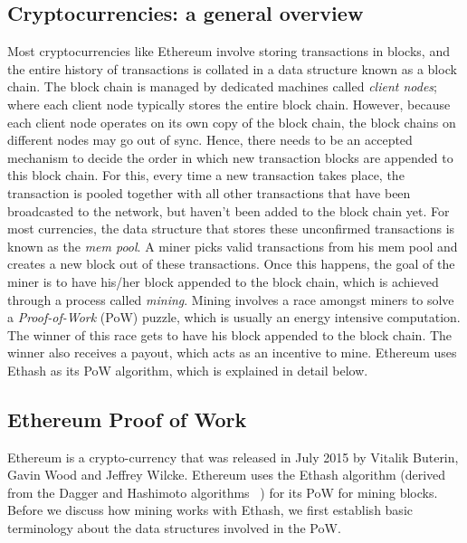 \documentclass[runningheads]{llncs}
\begin{document}
\subsection{Cryptocurrencies: a general overview}
Most cryptocurrencies like Ethereum involve storing transactions in blocks, and the entire history of transactions is collated in a data structure known as a block chain. The block chain is managed by dedicated machines called \emph{client nodes}; where each client node typically stores the entire block chain. However, because each client node operates on its own copy of the block chain, the block chains on different nodes may go out of sync. Hence, there needs to be an accepted mechanism to decide the order in which new transaction blocks are appended to this block chain. 
For this, every time a new transaction takes place, the transaction is pooled together with all other transactions that have been broadcasted to the network, but haven't been added to the block chain yet. For most currencies, the data structure that stores these unconfirmed transactions is known as the \emph{mem pool}. A miner picks valid transactions from his mem pool and creates a new block out of these transactions. Once this happens, the goal of the miner is to have his/her block appended to the block chain, which is achieved through a process called \emph{mining}.
Mining involves a race amongst miners to solve a \emph{Proof-of-Work} (PoW) puzzle, which is usually an energy intensive computation. The winner of this race gets to have his block appended to the block chain. The winner also receives a payout, which acts as an incentive to mine. 
Ethereum uses Ethash as its PoW algorithm, which is explained in detail below.

\subsection{Ethereum Proof of Work}
Ethereum is a crypto-currency that was released in July 2015 by Vitalik Buterin, Gavin Wood and Jeffrey Wilcke. Ethereum uses the Ethash algorithm (derived from the Dagger and Hashimoto algorithms ~\cite{dagger-hashimoto}) for its PoW for mining blocks. Before we discuss how mining works with Ethash, we first establish basic terminology about the data structures involved in the PoW.
\end{document}
